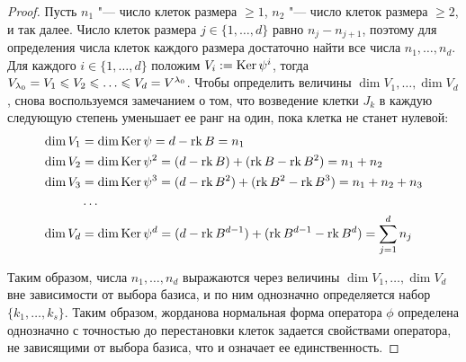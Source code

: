 \begin{proof}
	Пусть $n_1$ "--- число клеток размера $\ge 1$, $n_2$ "--- число клеток размера $\ge 2$, и так далее. Число клеток размера $j \in \{1, \dotsc, d\}$ равно $n_j - n_{j + 1}$, поэтому для определения числа клеток каждого размера достаточно найти все числа $n_1, \dotsc, n_d$. Для каждого $i \in \{1, \dotsc, d\}$ положим $V_i := \operatorname{Ker}{\psi^i}$, тогда $V_{\lambda_0} \hm{=} V_1 \le V_2 \hm{\le} \dots \hm{\le} V_d = V^{\lambda_0}$. Чтобы определить величины $\dim{V_1}, \dots, \dim{V_d}$, снова воспользуемся замечанием о том, что возведение клетки $J_k$ в каждую следующую степень уменьшает ее ранг на один, пока клетка не станет нулевой:
	\begin{align*}
		\dim{V_1} &= \dim{\operatorname{Ker}{\psi}} = d - \operatorname{rk}{B} = n_1\\
		\dim{V_2} &= \dim{\operatorname{Ker}{\psi^2}} = (d - \operatorname{rk}{B}) + (\operatorname{rk}{B} - \operatorname{rk}{B^2}) = n_1 + n_2\\
		\dim{V_3} &= \dim{\operatorname{Ker}{\psi^3}} = (d - \operatorname{rk}{B^2}) + (\operatorname{rk}{B^2} - \operatorname{rk}{B^3}) = n_1 + n_2 + n_3\\
		&\dots\\
		\dim{V_d} &= \dim{\operatorname{Ker}{\psi^d}} = (d - \operatorname{rk}{B^{d - 1}}) + (\operatorname{rk}{B^{d - 1}} - \operatorname{rk}{B^d})= \sum_{j = 1}^dn_j
	\end{align*}
	
	Таким образом, числа $n_1, \dotsc, n_d$ выражаются через величины $\dim{V_1}, \dotsc, \dim{V_d}$ вне зависимости от выбора базиса, и по ним однозначно определяется набор $\{k_1, \dots, k_s\}$. Таким образом, жорданова нормальная форма оператора $\phi$ определена однозначно с точностью до перестановки клеток задается свойствами оператора, не зависящими от выбора базиса, что и означает ее единственность.
\end{proof}